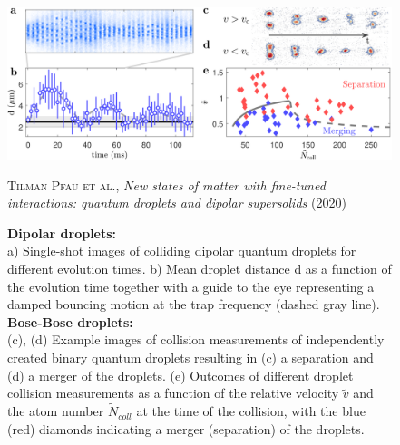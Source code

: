 \begin{figure}[H]
    \centering
    \includegraphics[width=1.0\textwidth]{IMAGE/droplet_collision.png}\\
    \caption{
        \textbf{Dipolar droplets:} \\
        a) Single-shot images of colliding dipolar quantum droplets for different evolution times.
        b) Mean droplet distance d as a function of the evolution time together with a guide to the eye representing
           a damped bouncing motion at the trap frequency (dashed gray line). \\
        \textbf{Bose-Bose droplets:} \\
        (c), (d) Example images of collision measurements of independently created binary
        quantum droplets resulting in (c) a separation and (d) a merger of the droplets.
        (e) Outcomes of different droplet collision measurements as a function of the relative velocity
        $\tilde{v}$ and the atom number $\tilde{N}_{coll}$ at the time of the collision,
        with the blue (red) diamonds indicating a merger (separation) of the droplets.
    }
    \textsc{Tilman Pfau et al.}, \emph{New states of matter with fine-tuned interactions:
        quantum droplets and dipolar supersolids} (2020)
    \label{fig:droplet_collision}
\end{figure}


